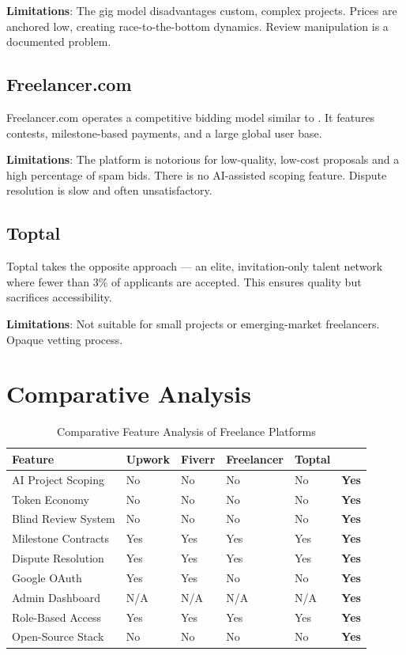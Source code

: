 \textbf{Limitations}: The gig model disadvantages custom, complex projects. Prices are anchored low, creating race-to-the-bottom dynamics. Review manipulation is a documented problem.

\subsection{Freelancer.com}

Freelancer.com \cite{freelancer2024} operates a competitive bidding model similar to \projectname{}. It features contests, milestone-based payments, and a large global user base.

\textbf{Limitations}: The platform is notorious for low-quality, low-cost proposals and a high percentage of spam bids. There is no AI-assisted scoping feature. Dispute resolution is slow and often unsatisfactory.

\subsection{Toptal}

Toptal \cite{toptal2024} takes the opposite approach --- an elite, invitation-only talent network where fewer than 3\% of applicants are accepted. This ensures quality but sacrifices accessibility.

\textbf{Limitations}: Not suitable for small projects or emerging-market freelancers. Opaque vetting process.

\section{Comparative Analysis}

\begin{table}[H]
\centering
\caption{Comparative Feature Analysis of Freelance Platforms}
\begin{tabularx}{\textwidth}{lXXXXX}
\toprule
\textbf{Feature} & \textbf{Upwork} & \textbf{Fiverr} & \textbf{Freelancer} & \textbf{Toptal} & \textbf{\projectname{}} \\
\midrule
AI Project Scoping    & No   & No   & No   & No   & \textbf{Yes} \\
Token Economy         & No   & No   & No   & No   & \textbf{Yes} \\
Blind Review System   & No   & No   & No   & No   & \textbf{Yes} \\
Milestone Contracts   & Yes  & Yes  & Yes  & Yes  & \textbf{Yes} \\
Dispute Resolution    & Yes  & Yes  & Yes  & Yes  & \textbf{Yes} \\
Google OAuth          & Yes  & Yes  & No   & No   & \textbf{Yes} \\
Admin Dashboard       & N/A  & N/A  & N/A  & N/A  & \textbf{Yes} \\
Role-Based Access     & Yes  & Yes  & Yes  & Yes  & \textbf{Yes} \\
Open-Source Stack     & No   & No   & No   & No   & \textbf{Yes} \\
\bottomrule
\end{tabularx}
\label{tab:platform_comparison}
\end{table}

